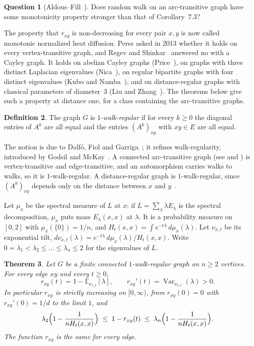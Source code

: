 \documentclass[11pt]{amsart}
\newtheorem{theorem}{Theorem}[section]
\theoremstyle{definition}
\newtheorem{definition}[theorem]{Definition}
\newtheorem{question}[theorem]{Question}
\theoremstyle{remark}
\DeclareMathOperator{\Var}{Var}
\newcommand{\E}{\mathbb{E}}
\begin{document}
\begin{question}[{Aldous--Fill~\cite[Open Problem~7.30, p.~262]{AF}}]\label{q:AF}
Does random walk on an arc-transitive graph have some monotonicity property stronger than that of Corollary~7.3?
\end{question}

The property that $r_{xy}$ is non-decreasing for every pair $x,y$ is now called monotonic normalized heat diffusion. Peres asked in 2013 whether it holds on every vertex-transitive graph, and Regev and Shinkar~\cite{RS} answered no with a Cayley graph. It holds on abelian Cayley graphs (Price~\cite{Pr}), on graphs with three distinct Laplacian eigenvalues (Nica~\cite{Ni}), on regular bipartite graphs with four distinct eigenvalues (Kubo and Namba~\cite{KN}), and on distance-regular graphs with classical parameters of diameter~$3$ (Liu and Zhang~\cite{LZ}). The theorems below give such a property at distance one, for a class containing the arc-transitive graphs.

\begin{definition}
The graph $G$ is \emph{$1$-walk-regular} if for every $k\ge0$ the diagonal entries of $A^k$ are all equal and the entries $(A^k)_{xy}$ with $xy\in E$ are all equal.
\end{definition}

The notion is due to Dalf\'o, Fiol and Garriga~\cite{DFG}; it refines walk-regularity, introduced by Godsil and McKay~\cite{GM}. A connected arc-transitive graph (see \cite[Ch.~17]{Bi} and \cite[Ch.~4]{GR}) is vertex-transitive and edge-transitive, and an automorphism carries walks to walks, so it is $1$-walk-regular. A distance-regular graph is $1$-walk-regular, since $(A^k)_{xy}$ depends only on the distance between $x$ and $y$~\cite[Chapter~4]{BCN}.

Let $\mu_x$ be the spectral measure of $L$ at $x$: if $L=\sum_\lambda \lambda E_\lambda$ is the spectral decomposition, $\mu_x$ puts mass $E_\lambda(x,x)$ at $\lambda$. It is a probability measure on $[0,2]$ with $\mu_x(\{0\})=1/n$, and $H_t(x,x)=\int e^{-t\lambda}\,d\mu_x(\lambda)$. Let $\nu_{x,t}$ be its exponential tilt, $d\nu_{x,t}(\lambda)=e^{-t\lambda}\,d\mu_x(\lambda)/H_t(x,x)$. Write $0=\lambda_1<\lambda_2\le\dots\le\lambda_n\le2$ for the eigenvalues of $L$.

\begin{theorem}\label{thm:main}
Let $G$ be a finite connected $1$-walk-regular graph on $n\ge2$ vertices. For every edge $xy$ and every $t\ge0$,
\begin{equation}\label{eq:mean}
r_{xy}(t)=1-\E_{\nu_{x,t}}[\lambda],\qquad r_{xy}'(t)=\Var_{\nu_{x,t}}(\lambda)>0 .
\end{equation}
In particular $r_{xy}$ is strictly increasing on $[0,\infty)$, from $r_{xy}(0)=0$ with $r_{xy}'(0)=1/d$ to the limit $1$, and
\begin{equation}\label{eq:bounds}
\lambda_2\Bigl(1-\frac{1}{nH_t(x,x)}\Bigr)\;\le\;1-r_{xy}(t)\;\le\;\lambda_n\Bigl(1-\frac{1}{nH_t(x,x)}\Bigr).
\end{equation}
The function $r_{xy}$ is the same for every edge.
\end{theorem}
\end{document}
